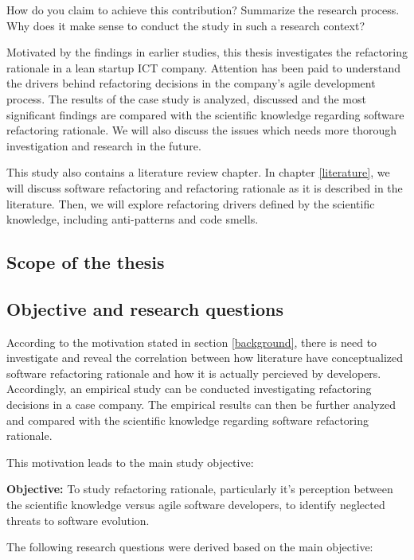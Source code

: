 \documentclass[english,12pt,a4paper,pdftex,sci,utf8]{aaltothesis}
\begin{document}
How do you claim to achieve this contribution? Summarize the research process. Why does it make sense to conduct the study in such a research context? 

Motivated by the findings in earlier studies, this thesis investigates the refactoring rationale in a lean startup ICT company. Attention has been paid to understand the drivers behind refactoring decisions in the company's agile development process. The results of the case study is analyzed, discussed and the most significant findings are compared with the scientific knowledge regarding software refactoring rationale. We will also discuss the issues which needs more thorough investigation and research in the future.

This study also contains a literature review chapter. In chapter \ref{literature}, we will discuss software refactoring and refactoring rationale as it is described in the literature. Then, we will explore refactoring drivers defined by the scientific knowledge, including anti-patterns and code smells.

\subsection{Scope of the thesis} \label{scope}

\subsection{Objective and research questions} \label{questions}
According to the motivation stated in section \ref{background}, there is need to investigate and reveal the correlation between how literature have conceptualized software refactoring rationale and how it is actually percieved by developers. Accordingly, an empirical study can be conducted investigating refactoring decisions in a case company. The empirical results can then be further analyzed and compared with the scientific knowledge regarding software refactoring rationale. 

This motivation leads to the main study objective:

\textbf{Objective:} To study refactoring rationale, particularly it's perception between the scientific knowledge versus agile software developers, to identify neglected threats to software evolution.

The following research questions were derived based on the main objective:
\end{document}
